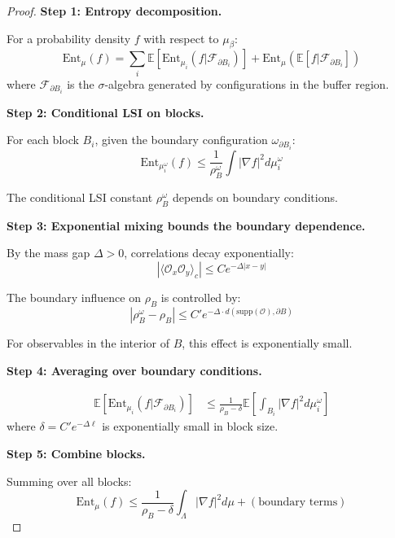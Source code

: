 \begin{proof}
\textbf{Step 1: Entropy decomposition.}

For a probability density $f$ with respect to $\mu_\beta$:
\begin{equation}
\mathrm{Ent}_{\mu}(f) = \sum_i \mathbb{E}[\mathrm{Ent}_{\mu_i}(f | \mathcal{F}_{\partial B_i})]
+ \mathrm{Ent}_\mu(\mathbb{E}[f | \mathcal{F}_{\partial B_i}])
\end{equation}
where $\mathcal{F}_{\partial B_i}$ is the $\sigma$-algebra generated by 
configurations in the buffer region.

\textbf{Step 2: Conditional LSI on blocks.}

For each block $B_i$, given the boundary configuration $\omega_{\partial B_i}$:
\begin{equation}
\mathrm{Ent}_{\mu_i^{\omega}}(f) \leq \frac{1}{\rho_B^{\omega}} 
\int |\nabla f|^2 d\mu_i^{\omega}
\end{equation}

The conditional LSI constant $\rho_B^{\omega}$ depends on boundary conditions.

\textbf{Step 3: Exponential mixing bounds the boundary dependence.}

By the mass gap $\Delta > 0$, correlations decay exponentially:
\begin{equation}
|\langle \mathcal{O}_x \mathcal{O}_y \rangle_c| \leq C e^{-\Delta |x-y|}
\end{equation}

The boundary influence on $\rho_B$ is controlled by:
\begin{equation}
|\rho_B^{\omega} - \rho_B| \leq C' e^{-\Delta \cdot d(\mathrm{supp}(\mathcal{O}), \partial B)}
\end{equation}

For observables in the interior of $B$, this effect is exponentially small.

\textbf{Step 4: Averaging over boundary conditions.}

\begin{align}
\mathbb{E}[\mathrm{Ent}_{\mu_i}(f | \mathcal{F}_{\partial B_i})] &\leq 
\frac{1}{\rho_B - \delta} \mathbb{E}\left[\int_{B_i} |\nabla f|^2 d\mu_i^{\omega}\right]
\end{align}
where $\delta = C' e^{-\Delta \ell}$ is exponentially small in block size.

\textbf{Step 5: Combine blocks.}

Summing over all blocks:
\begin{equation}
\mathrm{Ent}_\mu(f) \leq \frac{1}{\rho_B - \delta} \int_\Lambda |\nabla f|^2 d\mu
+ (\text{boundary terms})
\end{equation}


\end{proof}
